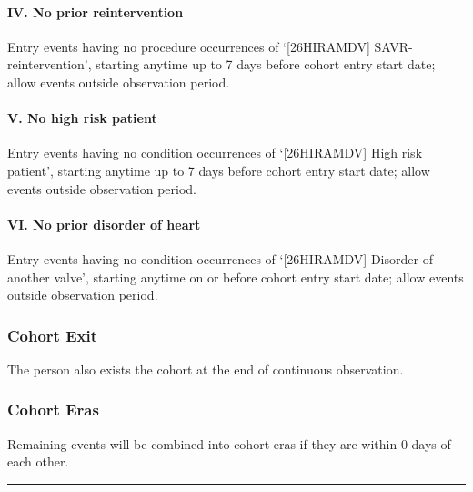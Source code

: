 \documentclass[
  12pt,
]{article}
\begin{document}
\paragraph*{IV. No prior
reintervention}\label{iv.-no-prior-reintervention}

Entry events having no procedure occurrences of `{[}26HIRAMDV{]}
SAVR-reintervention', starting anytime up to 7 days before cohort entry
start date; allow events outside observation period.

\paragraph*{V. No high risk patient}\label{v.-no-high-risk-patient}

Entry events having no condition occurrences of `{[}26HIRAMDV{]} High
risk patient', starting anytime up to 7 days before cohort entry start
date; allow events outside observation period.

\paragraph*{VI. No prior disorder of
heart}\label{vi.-no-prior-disorder-of-heart}

Entry events having no condition occurrences of `{[}26HIRAMDV{]}
Disorder of another valve', starting anytime on or before cohort entry
start date; allow events outside observation period.

\subsubsection{Cohort Exit}\label{cohort-exit-1}

The person also exists the cohort at the end of continuous observation.

\subsubsection{Cohort Eras}\label{cohort-eras-1}

Remaining events will be combined into cohort eras if they are within 0
days of each other.

\begin{center}\rule{0.5\linewidth}{0.5pt}\end{center}
\end{document}
